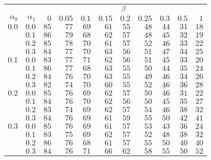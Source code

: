 \begin{tabular}{rr|rrrrrrrrr}
\hline\hline
 && \multicolumn{9}{c}{$\beta$}\\
 $\alpha_0$ & $\alpha_1$ & $0$ & $0.05$ & $0.1$ & $0.15$ & $0.2$ & $0.25$ & $0.3$ & $0.5$ & $1$ \\ 
 \hline
$0.0$ & $0.0$ & $85$ & $77$ & $69$ & $61$ & $55$ & $48$ & $44$ & $31$ & $18$\\ 
 & $0.1$ & $86$ & $79$ & $68$ & $62$ & $57$ & $48$ & $45$ & $32$ & $19$\\ 
 & $0.2$ & $85$ & $78$ & $70$ & $61$ & $57$ & $52$ & $46$ & $33$ & $22$\\ 
 & $0.3$ & $84$ & $77$ & $70$ & $63$ & $56$ & $51$ & $47$ & $34$ & $25$\\ 
\hline 
 $0.1$ & $0.0$ & $83$ & $77$ & $71$ & $62$ & $56$ & $51$ & $45$ & $33$ & $20$\\ 
 & $0.1$ & $86$ & $77$ & $68$ & $63$ & $55$ & $50$ & $44$ & $35$ & $24$\\ 
 & $0.2$ & $84$ & $76$ & $70$ & $63$ & $55$ & $49$ & $46$ & $34$ & $26$\\ 
 & $0.3$ & $82$ & $74$ & $70$ & $60$ & $55$ & $52$ & $46$ & $36$ & $28$\\ 
\hline 
 $0.2$ & $0.0$ & $85$ & $76$ & $69$ & $62$ & $57$ & $50$ & $46$ & $31$ & $22$\\ 
 & $0.1$ & $84$ & $76$ & $70$ & $62$ & $56$ & $50$ & $45$ & $35$ & $27$\\ 
 & $0.2$ & $83$ & $74$ & $69$ & $62$ & $57$ & $54$ & $46$ & $38$ & $32$\\ 
 & $0.3$ & $84$ & $76$ & $69$ & $61$ & $59$ & $55$ & $50$ & $42$ & $41$\\ 
\hline 
 $0.3$ & $0.0$ & $85$ & $76$ & $69$ & $61$ & $57$ & $53$ & $43$ & $36$ & $24$\\ 
 & $0.1$ & $83$ & $75$ & $69$ & $62$ & $57$ & $52$ & $48$ & $38$ & $32$\\ 
 & $0.2$ & $86$ & $76$ & $68$ & $61$ & $57$ & $55$ & $50$ & $40$ & $40$\\ 
 & $0.3$ & $84$ & $76$ & $71$ & $66$ & $62$ & $58$ & $55$ & $50$ & $52$\\ 
 \hline 
 \end{tabular}
